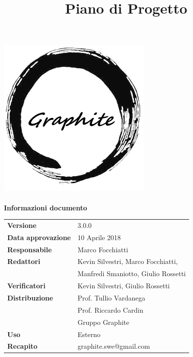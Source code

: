 \documentclass[openany,12pt,a4paper]{report}
\title{Piano di Progetto}
\author{}
\newcommand{\versione}{3.0.0}
\begin{document}
	\makeatletter
	\begin{titlepage}
		\setlength{\headsep}{0pt}  
		\begin{center}
			\includegraphics[width=0.5\linewidth]{Logo.png}\\[1em]
			{\huge \bfseries  \@title }\\[10ex]
			\textbf{\Large Informazioni documento} \\[2em]
			\bgroup
			\def\arraystretch{1.5}
			\begin{tabular}{l|l}
				\textbf{Versione} & \versione{}  \\
				\textbf{Data approvazione} & 10 Aprile 2018 \\
				\textbf{Responsabile} & Marco Focchiatti \\
				\textbf{Redattori} & Kevin Silvestri, Marco Focchiatti, \\ 
								   & Manfredi Smaniotto, Giulio Rossetti \\
				\textbf{Verificatori} & Kevin Silvestri, Giulio Rossetti \\
				\textbf{Distribuzione} & Prof. Tullio Vardanega \\
				 & Prof. Riccardo Cardin \\
				 & Gruppo Graphite \\
				\textbf{Uso} & Esterno \\
				\textbf{Recapito} & graphite.swe@gmail.com \\
			\end{tabular}
		\egroup
		\end{center}
	\end{titlepage}
	\makeatother

	\thispagestyle{empty}
	\newpage
	
	
	
	\tableofcontents
	\listoffigures
	\listoftables
	
	
	
	
	
	
	
\end{document}

